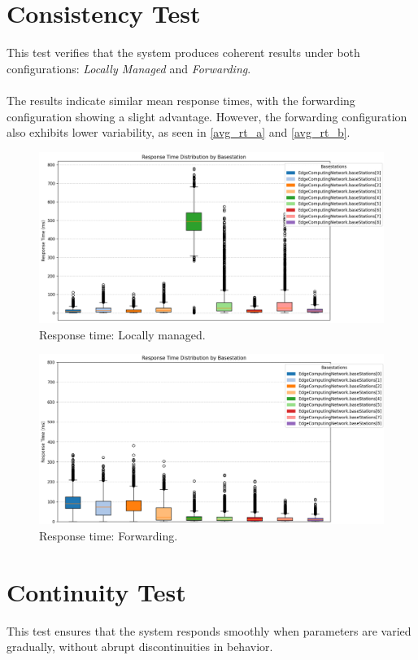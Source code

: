 \documentclass{report}
\begin{document}
\section{Consistency Test}
This test verifies that the system produces coherent results under both configurations: \textit{Locally Managed} and \textit{Forwarding}. \\\\
The results indicate similar mean response times, with the forwarding configuration showing a slight advantage. However, the forwarding configuration also exhibits lower variability, as seen in \autoref{avg_rt_a} and \autoref{avg_rt_b}.

\begin{figure}[H]
    \centering
    \includegraphics[width=1\textwidth]{img/avg_rt_a.png}
    \caption{Response time: Locally managed.}
    \label{avg_rt_a}
\end{figure}

\begin{figure}[H]
    \centering
    \includegraphics[width=1\textwidth]{img/avg_rt_b.png}
    \caption{Response time: Forwarding.}
    \label{avg_rt_b}
\end{figure}

\section{Continuity Test}
This test ensures that the system responds smoothly when parameters are varied gradually, without abrupt discontinuities in behavior.
\end{document}
